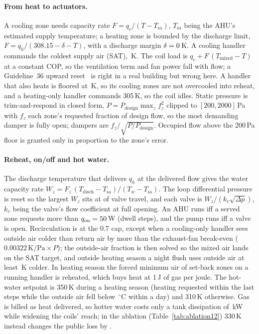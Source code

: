 \documentclass{article}
\begin{document}
\paragraph{From heat to actuators.} A cooling zone needs capacity rate $F = q_c/(T - T_{\text{sa}})$, $T_{\text{sa}}$ being the AHU's estimated supply temperature; a heating zone is bounded by the discharge limit, $F = q_h/(308.15 - \delta - T)$, with a discharge margin $\delta = 0$\,K. A cooling handler commands the coldest supply air (SAT), \ParSatCoolHi\,K. The coil load is $q_c + F\,(T_{\text{mixed}} - T)$ at a constant COP, so the ventilation term and fan power fall with flow; a Guideline~36 upward reset~\citep{ashrae2021g36,taylor2018vav} is right in a real building but wrong here. A handler that also heats is floored at \ParSatMixFloor\,K, so its cooling zones are not overcooled into reheat, and a heating-only handler commands 305\,K, so the coil idles. Static pressure is trim-and-respond in closed form, $P = P_{\text{design}}\max_z f_z^2$ clipped to $[200, 2000]$\,Pa with $f_z$ each zone's requested fraction of design flow, so the most demanding damper is fully open; dampers are $f_z/\sqrt{P/P_{\text{design}}}$. Occupied flow above the 200\,Pa floor is granted only in proportion to the zone's error.

\paragraph{Reheat, on/off and hot water.} The discharge temperature that delivers $q_h$ at the delivered flow gives the water capacity rate $W_z = F_z\,(T_{\text{disch}} - T_{\text{sa}})/(T_w - T_{\text{sa}})$. The loop differential pressure is reset so the largest $W_z$ sits at \ParValveTarget{} of valve travel, and each valve is $W_z/(k_v \sqrt{\Delta p})$, $k_v$ being the valve's flow coefficient at full opening. An AHU runs iff a served zone requests more than $q_{\text{on}} = 50$\,W (dwell \ParMinOnSteps{} steps), and the pump runs iff a valve is open. Recirculation is at the 0.7 cap, except when a cooling-only handler sees outside air colder than return air by more than the exhaust-fan break-even ($0.00322\,\text{K/Pa}\times P$); the outside-air fraction is then solved so the mixed air lands on the SAT target, and outside heating season a night flush uses outside air at least \ParRFFlushDt\,K colder. In heating season the forced minimum air of set-back zones on a running handler is reheated, which buys heat at 1\,J of gas per joule. The hot-water setpoint is 350\,K during a heating season (heating requested within the last \RTenSeasonSteps{} steps while the outside air fell below \RTenSeasonOatC\,$^\circ$C within a day) and 310\,K otherwise. Gas is billed as heat delivered, so hotter water costs only a tank dissipation of \TankLossExtraKw\,kW while widening the coils' reach; in the ablation (Table~\ref{tab:ablation12}) 330\,K instead changes the public loss by \RElvAbTwRel.
\end{document}
